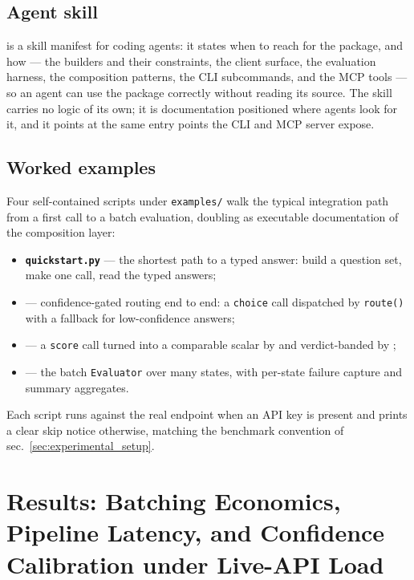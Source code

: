 \documentclass[
  english,
]{article}
\providecommand{\tightlist}{%
  \setlength{\itemsep}{0pt}\setlength{\parskip}{0pt}}
\begin{document}
\subsection{Agent skill}\label{agent-skill}

 is a skill manifest for coding agents:
it states when to reach for the package, and how --- the builders and
their constraints, the client surface, the evaluation harness, the
composition patterns, the CLI subcommands, and the MCP tools --- so an
agent can use the package correctly without reading its source. The
skill carries no logic of its own; it is documentation positioned where
agents look for it, and it points at the same entry points the CLI and
MCP server expose.

\subsection{Worked examples}\label{worked-examples}

Four self-contained scripts under \texttt{examples/} walk the typical
integration path from a first call to a batch evaluation, doubling as
executable documentation of the composition layer:

\begin{itemize}
\tightlist
\item
  \textbf{\texttt{quickstart.py}} --- the shortest path to a typed
  answer: build a question set, make one call, read the typed answers;
\item
  \textbf{} --- confidence-gated routing end
  to end: a \texttt{choice} call dispatched by \texttt{route()} with a
  fallback for low-confidence answers;
\item
  \textbf{} --- a \texttt{score} call
  turned into a comparable scalar by  and
  verdict-banded by ;
\item
  \textbf{} --- the batch \texttt{Evaluator}
  over many states, with per-state failure capture and summary
  aggregates.
\end{itemize}

Each script runs against the real endpoint when an API key is present
and prints a clear skip notice otherwise, matching the benchmark
convention of sec.~\ref{sec:experimental_setup}.

\newpage

\section{Results: Batching Economics, Pipeline Latency, and Confidence
Calibration under Live-API Load}\label{sec:results}
\end{document}
